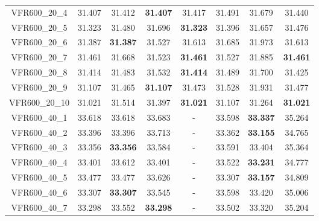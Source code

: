 \begin{tabular}{cc|ccc|ccc}
VFR600\_20\_4      & 31.407           & 31.412           & {\bf 31.407}     & 31.417           & 31.491           & 31.679           & 31.440          \\ 
VFR600\_20\_5      & 31.323           & 31.480           & 31.696           & {\bf 31.323}     & 31.396           & 31.657           & 31.476          \\ 
VFR600\_20\_6      & 31.387           & {\bf 31.387}     & 31.527           & 31.613           & 31.685           & 31.973           & 31.613          \\ 
VFR600\_20\_7      & 31.461           & 31.668           & 31.523           & {\bf 31.461}     & 31.527           & 31.885           & {\bf 31.461}    \\ 
VFR600\_20\_8      & 31.414           & 31.483           & 31.532           & {\bf 31.414}     & 31.489           & 31.700           & 31.425          \\ 
VFR600\_20\_9      & 31.107           & 31.465           & {\bf 31.107}     & 31.473           & 31.528           & 31.931           & 31.477          \\ 
VFR600\_20\_10     & 31.021           & 31.514           & 31.397           & {\bf 31.021}     & 31.107           & 31.264           & {\bf 31.021}    \\ 
VFR600\_40\_1      & 33.618           & 33.618           & 33.683           & -                & 33.598           & {\bf 33.337}     & 35.264          \\ 
VFR600\_40\_2      & 33.396           & 33.396           & 33.713           & -                & 33.362           & {\bf 33.155}     & 34.765          \\ 
VFR600\_40\_3      & 33.356           & {\bf 33.356}     & 33.584           & -                & 33.591           & 33.404           & 35.364          \\ 
VFR600\_40\_4      & 33.401           & 33.612           & 33.401           & -                & 33.522           & {\bf 33.231}     & 34.777          \\ 
VFR600\_40\_5      & 33.477           & 33.477           & 33.626           & -                & 33.307           & {\bf 33.157}     & 34.809          \\ 
VFR600\_40\_6      & 33.307           & {\bf 33.307}     & 33.545           & -                & 33.598           & 33.420           & 35.006          \\ 
VFR600\_40\_7      & 33.298           & 33.552           & {\bf 33.298}     & -                & 33.502           & 33.320           & 35.204          \\ 

\end{tabular}
